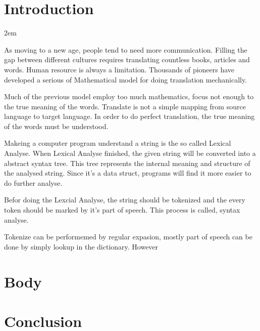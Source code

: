 \section{Introduction}

\parindent 2em

\noindent As moving to a new age, people tend to need more communication. Filling the gap between different cultures requires translating countless books, articles and words. Human resource is always a limitation. Thousands of 
pioneers have developed a serious of Mathematical model for doing translation mechanically. 

Much of the previous model employ too much mathematics, focus not enough to the true meaning of the words.
Translate is not a simple mapping from source language to target language. In order to do perfect translation,
the true meaning of the words must be understood. 

Makeing a computer program understand a string is the so called Lexical Analyse. 
When Lexical Analyse finished, the given string will be converted into a abstract syntax tree. 
This tree represents the internal meaning and structure of the analysed string. Since it's a data struct, programs 
will find it more easier to do further analyse.\cite{Compilers_Principles_Techniques_and_Tools}

Befor doing the Lexcial Analyse, the string should be tokenized and the every token should be marked by it's part of speech.
This process is called, syntax analyse.

Tokenize can be performemed by regular expasion, mostly part of speech can be done by simply lookup in the dictionary. However

\section{Body}

\section{Conclusion}
